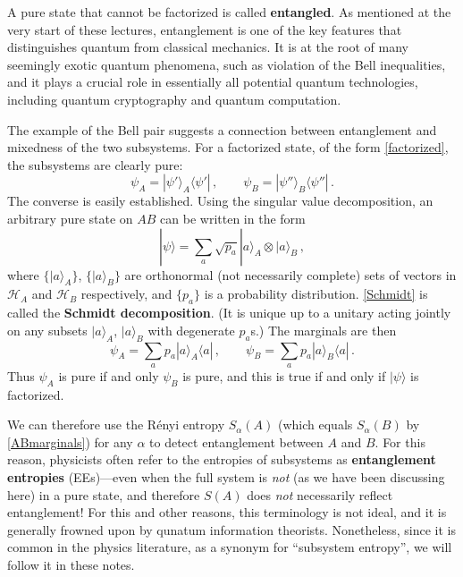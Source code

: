 \documentclass[11pt]{article}
\newcommand{\ket}[1]{|{#1}\rangle}
\newcommand{\bra}[1]{\langle{#1}|}
\newcommand{\HH}{\mathcal{H}}
\begin{document}
A pure state that cannot be factorized is called \textbf{entangled}. As mentioned at the very start of these lectures, entanglement is one of the key features that distinguishes quantum from classical mechanics. It is at the root of many seemingly exotic quantum phenomena, such as violation of the Bell inequalities, and it plays a crucial role in essentially all potential quantum technologies, including quantum cryptography and quantum computation.

The example of the Bell pair suggests a connection between entanglement and mixedness of the two subsystems. For a factorized state, of the form \eqref{factorized}, the subsystems are clearly pure:
\begin{equation}
\psi_A = \ket{\psi'}_A\bra{\psi'}\,,\qquad
\psi_B = \ket{\psi''}_B\bra{\psi''}\,.
\end{equation}
The converse is easily established. Using the singular value decomposition, an arbitrary pure state on $AB$ can be written in the form
\begin{equation}\label{Schmidt}
\ket{\psi} = \sum_{a}\sqrt{p_a}\ket{a}_A\otimes\ket{a}_B\,,
\end{equation}
where $\{\ket{a}_A\}$, $\{\ket{a}_B\}$ are orthonormal (not necessarily complete) sets of vectors in $\HH_A$ and $\HH_B$ respectively, and $\{p_a\}$ is a probability distribution. \eqref{Schmidt} is called the \textbf{Schmidt decomposition}. (It is unique up to a unitary acting jointly on any subsets $\ket{a}_A$, $\ket{a}_B$ with degenerate $p_a$s.) The marginals are then
\begin{equation}\label{ABmarginals}
\psi_A = \sum_ap_a\ket{a}_A\bra{a}\,,\qquad
\psi_B = \sum_ap_a\ket{a}_B\bra{a}\,.
\end{equation}
Thus $\psi_A$ is pure if and only $\psi_B$ is pure, and this is true if and only if $\ket{\psi}$ is factorized.

We can therefore use the R\'enyi entropy $S_\alpha(A)$ (which equals $S_\alpha(B)$ by \eqref{ABmarginals}) for any $\alpha$ to detect entanglement between $A$ and $B$. For this reason, physicists often refer to the entropies of subsystems as \textbf{entanglement entropies} (EEs)---even when the full system is \emph{not} (as we have been discussing here) in a pure state, and therefore $S(A)$ does \emph{not} necessarily reflect entanglement! For this and other reasons, this terminology is not ideal, and it is generally frowned upon by qunatum information theorists. Nonetheless, since it is common in the physics literature, as a synonym for ``subsystem entropy'', we will follow it in these notes.
\end{document}
